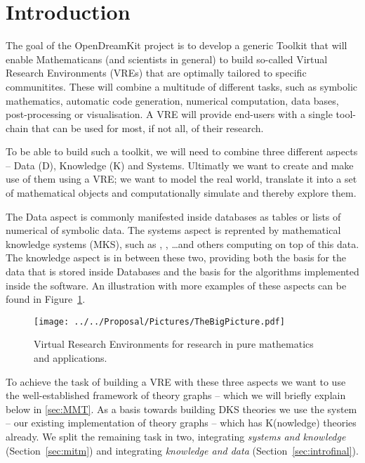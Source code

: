 \section{Introduction}\label{sec:intro}

The goal of the OpenDreamKit project \cite{ODKproposal:on} is to develop a generic Toolkit
that will enable Mathematicans (and scientists in general) to build so-called Virtual
Research Environments (VREs) that are optimally tailored to specific communitites. These
will combine a multitude of different tasks, such as symbolic mathematics, automatic code
generation, numerical computation, data bases, post-processing or visualisation. A VRE
will provide end-users with a single tool-chain that can be used for most, if not all, of
their research.

To be able to build such a toolkit, we will need to combine three different aspects --
Data (D), Knowledge (K) and Systems. Ultimatly we want to create and make use of them
using a VRE; we want to model the real world, translate it into a set of mathematical
objects and computationally simulate and thereby explore them.

The Data aspect is commonly manifested inside databases as tables or lists of numerical of
symbolic data. The systems aspect is reprented by mathematical knowledge systems (MKS),
such as \GAP, \Sage, \dots and others computing on top of this data. The knowledge aspect
is in between these two, providing both the basis for the data that is stored inside
Databases and the basis for the algorithms implemented inside the software. An
illustration with more examples of these aspects can be found in
Figure~\ref{fig:thebigpicture}.

\begin{figure}[H]\centering
  \texttt{[image: ../../Proposal/Pictures/TheBigPicture.pdf]}
  \caption{Virtual Research Environments for research in pure
    mathematics and applications.}
  \label{fig:thebigpicture}
\end{figure}

To achieve the task of building a VRE with these three aspects we want to use the
well-established framework of theory graphs -- which we will briefly explain below in
\ref{sec:MMT}. As a basis towards building DKS theories we use the \MMT system -- our
existing implementation of theory graphs -- which has K(nowledge) theories already. We
split the remaining task in two, integrating \textit{systems and knowledge}
(Section~\ref{sec:mitm}) and integrating \textit{knowledge and data}
(Section~\ref{sec:introfinal}).

